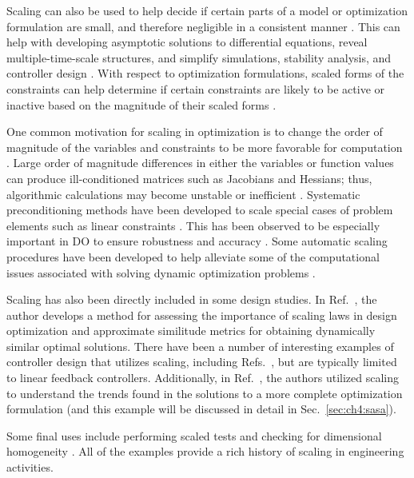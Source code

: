 Scaling can also be used to help decide if certain parts of a model or optimization formulation are small, and therefore negligible in a consistent manner \cite{Holmes2009a, Khalil2002a}.
This can help with developing asymptotic solutions to differential equations, reveal multiple-time-scale structures, and simplify simulations, stability analysis, and controller design \cite{Khalil2002a}.
With respect to optimization formulations, scaled forms of the constraints can help determine if certain constraints are likely to be active or inactive based on the magnitude of their scaled forms \cite{Papalambros2017a}.

One common motivation for scaling in optimization is to change the order of magnitude of the variables and constraints to be more favorable for computation \cite{Papalambros2017a, Rao2010a}.
Large order of magnitude differences in either the variables or function values can produce ill-conditioned matrices such as Jacobians and Hessians; thus, algorithmic calculations may become unstable or inefficient \cite{Papalambros2017a}.
Systematic preconditioning methods have been developed to scale special cases of problem elements such as linear constraints \cite{Bergamaschi2004a, Benzi2002a}.
This has been observed to be especially important in DO to ensure robustness and accuracy \cite{Rao2010a, Betts2010a}.
Some automatic scaling procedures have been developed to help alleviate some of the computational issues associated with solving dynamic optimization problems \cite{Rao2010a}.

Scaling has also been directly included in some design studies.
In Ref.~\cite{Kittirungsi2008a}, the author develops a method for assessing the importance of scaling laws in design optimization and approximate similitude metrics for obtaining dynamically similar optimal solutions. There have been a number of interesting examples of controller design that utilizes scaling, including Refs.~\cite{Ghanekar1997a, Brennan2001a}, but are typically limited to linear feedback controllers. 
Additionally, in Ref.~\cite{Chilan2017a}, the authors utilized scaling to understand the trends found in the solutions to a more complete optimization formulation (and this example will be discussed in detail in Sec.~\ref{sec:ch4:sasa}).

Some final uses include performing scaled tests \cite{Cengel2006a, Holmes2009a} and checking for dimensional homogeneity \cite{Cengel2006a}.
All of the examples provide a rich history of scaling in engineering activities.

